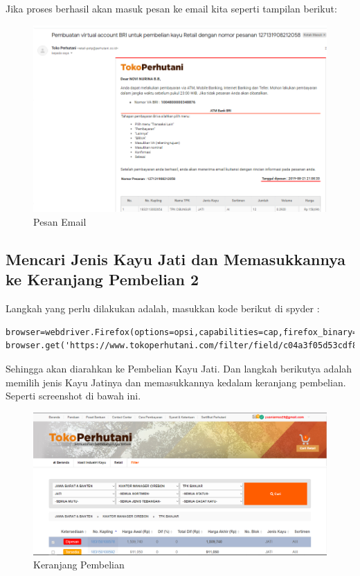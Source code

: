 Jika proses berhasil akan masuk pesan ke email kita seperti tampilan berikut:
\begin{figure}[h]
	\centering
	\includegraphics[scale=0.30]{figures/emailbayar}
	\caption{Pesan Email}
\end{figure}

\newpage
\subsection {Mencari Jenis Kayu Jati dan Memasukkannya ke Keranjang Pembelian 2}
Langkah yang perlu dilakukan adalah, masukkan kode berikut di spyder :
\begin{verbatim}
browser=webdriver.Firefox(options=opsi,capabilities=cap,firefox_binary=binary)
browser.get('https://www.tokoperhutani.com/filter/field/c04a3f05d53cdf8f8ac5cf643ba2504bd2f46bd0bb9a60877d640d51d96a6af5#')
\end{verbatim}

Sehingga akan diarahkan ke Pembelian Kayu Jati. Dan langkah berikutya adalah memilih jenis Kayu Jatinya dan memasukkannya kedalam keranjang pembelian. Seperti screenshot di bawah ini.
\begin{figure}[h]
	\centering
	\includegraphics[scale=0.25]{figures/T5_cart}
	\caption{Keranjang Pembelian}
\end{figure}

